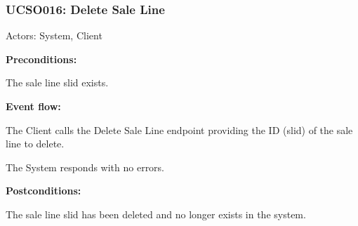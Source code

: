 \begin{ucbox}{\subsubsection{UCSO016: Delete Sale Line}}
\label{UCSO016}

Actors: System, Client

\textbf{Preconditions:}

\ucitem The sale line slid exists.

\textbf{Event flow:}

\ucitem The Client calls the Delete Sale Line endpoint providing the ID (slid) of the sale line to delete.

\ucitem The System responds with no errors.

\textbf{Postconditions:}

\ucitem The sale line slid has been deleted and no longer exists in the system.

\end{ucbox}
\newpage